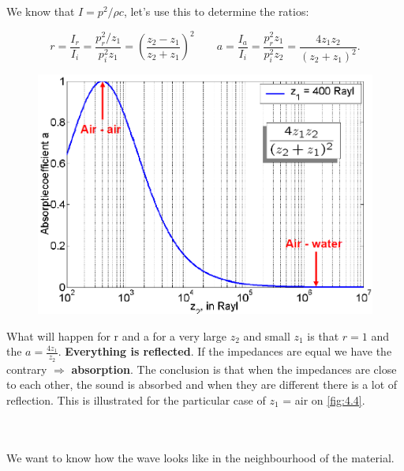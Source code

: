 	We know that $I = p^2/\rho c$, let's use this to determine the ratios:
	
	\begin{equation}
	r = \frac{I_r}{I_i} = \frac{p_r^2/z_1}{p_i^2 z_1} =  \left( \frac{z_2 - z_1}{z_2 + z_1} \right) ^2 \qquad a = \frac{I_a}{I_i} = \frac{p_r^2z_1}{p_i^2 z_2} =  \frac{4z_1 z_2}{(z_2 + z_1)^2}.
	\end{equation} 
	
	\begin{figure}
	\vspace{-5mm}
	\includegraphics[scale=0.2]{acoustics/ch4/4}
	\label{fig:4.4}
	\end{figure}
	What will happen for r and a for a very large $z_2$ and small $z_1$ is that $r=1$ and the $a= \frac{4z_1}{z_2}$. \textbf{Everything is reflected}. If the impedances are equal we have the contrary $\Rightarrow$ \textbf{absorption}. The conclusion is that when the impedances are close to each other, the sound is absorbed and when they are different there is a lot of reflection. This is illustrated for the particular case of $z_1$ = air on \autoref{fig:4.4}. 
	
	\ \\\\
	
	We want to know how the wave looks like in the neighbourhood of the material. 
	
